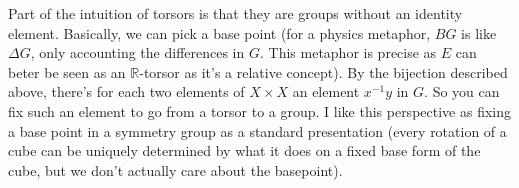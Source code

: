 \begin{remark}
Part of the intuition of torsors is that they are groups without an identity element. Basically, we can pick a base point (for a physics metaphor, $BG$ is like $\Delta G$, only accounting the differences in $G$. This metaphor is precise as $E$ can beter be seen as an $\mathbb R$-torsor as it's a relative concept). By the bijection described above, there's for each two elements of $X \times X$ an element $x^{-1}y$ in $G$. So you can fix such an element to go from a torsor to a group. I like this perspective as fixing a base point in a symmetry group as a standard presentation (every rotation of a cube can be uniquely determined by what it does on a fixed base form of the cube, but we don't actually care about the basepoint). 
\end{remark}


